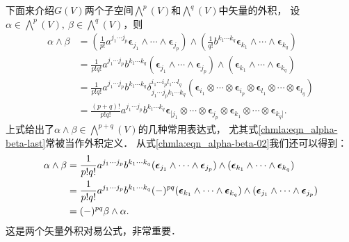 下面来介绍$G(V)$两个子空间$\bigwedge^p(V)$和$\bigwedge^q(V)$中矢量的外积，
设$\alpha\in \bigwedge^p(V), \ \beta \in \bigwedge^q(V)$，则
\begin{subequations}\label{chmla:eqn_alpha-beta}
\begin{align}
    \alpha \wedge \beta &= \left(\frac{1}{p!} a^{j_1\cdots j_p} \boldsymbol{\epsilon}_{j_1}
        \wedge \cdots \wedge \boldsymbol{\epsilon}_{j_p}\right) \wedge
        \left(\frac{1}{q!} b^{k_1\cdots k_q} \boldsymbol{\epsilon}_{k_1}
        \wedge \cdots \wedge \boldsymbol{\epsilon}_{k_q}    \right) \\
    &= \frac{1}{p! q!} a^{j_1\cdots j_p} b^{k_1\cdots k_q}
       (\boldsymbol{\epsilon}_{j_1} \wedge \cdots \wedge \boldsymbol{\epsilon}_{j_p}) \wedge
       (\boldsymbol{\epsilon}_{k_1} \wedge \cdots \wedge \boldsymbol{\epsilon}_{k_q})
       \label{chmla:eqn_alpha-beta-02} \\
    &= \frac{1}{p! q!} a^{j_1\cdots j_p} b^{k_1\cdots k_q}
       \delta_{j_1 \cdots j_p k_1 \cdots k_q}^{i_1 \cdots i_p l_1 \cdots l_q}
       (\boldsymbol{\epsilon}_{i_1} \otimes \cdots \otimes \boldsymbol{\epsilon}_{i_p} \otimes
       \boldsymbol{\epsilon}_{l_1} \otimes \cdots \otimes \boldsymbol{\epsilon}_{l_q})   \\
    &= \frac{(p+q)!}{p! q!} a^{j_1\cdots j_p} b^{k_1\cdots k_q}
       \boldsymbol{\epsilon}_{[j_1} \otimes \cdots \otimes \boldsymbol{\epsilon}_{j_p} \otimes
       \boldsymbol{\epsilon}_{k_1} \otimes \cdots \otimes \boldsymbol{\epsilon}_{k_q]} .
       \label{chmla:eqn_alpha-beta-last}
\end{align}
\end{subequations}  %
上式给出了$\alpha \wedge \beta \in \bigwedge^{p+q}(V)$的几种常用表达式，
尤其式\eqref{chmla:eqn_alpha-beta-last}常被当作外积定义．
从式\eqref{chmla:eqn_alpha-beta-02}我们还可以得到：
\begin{align}
    \alpha \wedge \beta &=\frac{1}{p! q!} a^{j_1\cdots j_p} b^{k_1\cdots k_q}
    (\boldsymbol{\epsilon}_{j_1} \wedge \cdots \wedge \boldsymbol{\epsilon}_{j_p}) \wedge
    (\boldsymbol{\epsilon}_{k_1} \wedge \cdots \wedge \boldsymbol{\epsilon}_{k_q}) \notag \\
    &= \frac{1}{p! q!} a^{j_1\cdots j_p} b^{k_1\cdots k_q} (-)^{pq}
    (\boldsymbol{\epsilon}_{k_1} \wedge \cdots \wedge \boldsymbol{\epsilon}_{k_q}) \wedge
    (\boldsymbol{\epsilon}_{j_1} \wedge \cdots \wedge \boldsymbol{\epsilon}_{j_p})  \notag \\
    &= (-)^{pq} \beta \wedge \alpha . \label{chmla:eqn_ab-alter}
\end{align}
这是两个矢量外积对易公式，非常重要．

